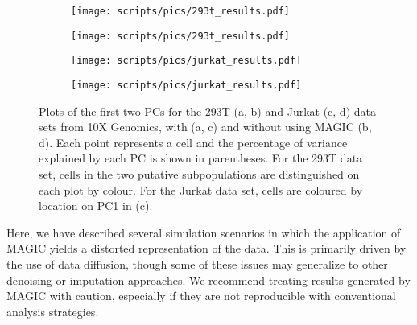 \documentclass[10pt,letterpaper]{article}
\begin{document}
\begin{figure}[btp]
\centering
\begin{subfigure}[b]{0.49\textwidth}
    \texttt{[image: scripts/pics/293t\_results.pdf]}
    \caption{}
\end{subfigure}
\begin{subfigure}[b]{0.49\textwidth}
    \texttt{[image: scripts/pics/293t\_results.pdf]}
    \caption{}
\end{subfigure}
\begin{subfigure}[b]{0.49\textwidth}
    \texttt{[image: scripts/pics/jurkat\_results.pdf]}
    \caption{}
\end{subfigure}
\begin{subfigure}[b]{0.49\textwidth}
    \texttt{[image: scripts/pics/jurkat\_results.pdf]}
    \caption{}
\end{subfigure}
\caption{Plots of the first two PCs for the 293T (a, b) and Jurkat (c, d) data sets from 10X Genomics, with (a, c) and without using MAGIC (b, d).
Each point represents a cell and the percentage of variance explained by each PC is shown in parentheses.
For the 293T data set, cells in the two putative subpopulations are distinguished on each plot by colour.
For the Jurkat data set, cells are coloured by location on PC1 in (c).}
\label{fig:realdata}
\end{figure}

Here, we have described several simulation scenarios in which the application of MAGIC yields a distorted representation of the data.
This is primarily driven by the use of data diffusion, though some of these issues may generalize to other denoising or imputation approaches.
We recommend treating results generated by MAGIC with caution, especially if they are not reproducible with conventional analysis strategies.



\end{document}
